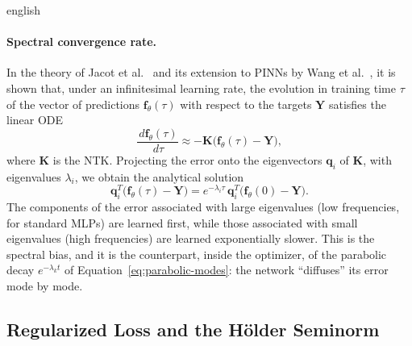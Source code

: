 \documentclass[../0000.tex]{subfiles}
\begin{document}
\begin{hyphenrules}{english}
\paragraph{Spectral convergence rate.}
In the theory of Jacot et al.~\cite{jacot2018} and its extension to PINNs by Wang et al.~\cite{wang2022ntk}, it is shown
that, under an infinitesimal learning rate, the evolution in training time $\tau$ of the vector of
predictions $\mathbf{f}_\theta(\tau)$ with respect to the targets $\mathbf{Y}$ satisfies the linear ODE
\begin{equation}
  \frac{\,d\mathbf{f}_\theta(\tau)}{\,d\tau}\approx-\mathbf{K}\big(\mathbf{f}_\theta(\tau)-\mathbf{Y}\big),
  \label{eq:ntk-ode}
\end{equation}
where $\mathbf{K}$ is the NTK. Projecting the error onto the eigenvectors $\mathbf{q}_i$ of $\mathbf{K}$,
with eigenvalues $\lambda_i$, we obtain the analytical solution
\begin{equation}
  \mathbf{q}_i^{T}\big(\mathbf{f}_\theta(\tau)-\mathbf{Y}\big)=e^{-\lambda_i\tau}\,\mathbf{q}_i^{T}\big(\mathbf{f}_\theta(0)-\mathbf{Y}\big).
  \label{eq:ntk-modes}
\end{equation}
The components of the error associated with large eigenvalues (low frequencies, for standard MLPs)
are learned first, while those associated with small eigenvalues (high frequencies) are learned
exponentially slower. This is the spectral bias, and it is the counterpart, inside the optimizer, of
the parabolic decay $e^{-\lambda_k t}$ of Equation~\eqref{eq:parabolic-modes}: the network ``diffuses'' its error
mode by mode.

\subsection{Regularized Loss and the Hölder Seminorm}


\end{hyphenrules}
\end{document}
